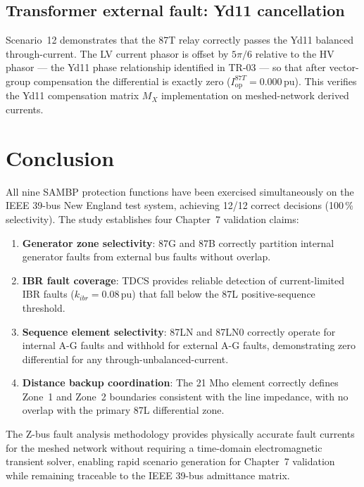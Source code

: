 \documentclass[12pt,a4paper]{article}
\newcommand{\Iop}{I_{\mathrm{op}}}
\begin{document}
\subsection{Transformer external fault: Yd11 cancellation}
\label{sec:yd11}

Scenario~12 demonstrates that the 87T relay correctly passes the Yd11
balanced through-current.  The LV current phasor is offset by $5\pi/6$
relative to the HV phasor — the Yd11 phase relationship identified in
TR-03 — so that after vector-group compensation the differential is
exactly zero ($\Iop^{87T} = 0.000$\,pu).  This verifies the Yd11
compensation matrix $M_X$ implementation on meshed-network derived currents.

\section{Conclusion}
\label{sec:conclusion}

All nine SAMBP protection functions have been exercised simultaneously on the
IEEE 39-bus New England test system, achieving 12/12 correct decisions
(100\,\% selectivity).  The study establishes four Chapter~7 validation claims:

\begin{enumerate}
  \item \textbf{Generator zone selectivity}: 87G and 87B correctly partition
    internal generator faults from external bus faults without overlap.
  \item \textbf{IBR fault coverage}: TDCS provides reliable detection of
    current-limited IBR faults ($k_{ibr} = 0.08$\,pu) that fall below the
    87L positive-sequence threshold.
  \item \textbf{Sequence element selectivity}: 87LN and 87LN0 correctly
    operate for internal A-G faults and withhold for external A-G faults,
    demonstrating zero differential for any through-unbalanced-current.
  \item \textbf{Distance backup coordination}: The 21 Mho element correctly
    defines Zone~1 and Zone~2 boundaries consistent with the line impedance,
    with no overlap with the primary 87L differential zone.
\end{enumerate}

The Z-bus fault analysis methodology provides physically accurate fault currents
for the meshed network without requiring a time-domain electromagnetic
transient solver, enabling rapid scenario generation for Chapter~7
validation while remaining traceable to the IEEE 39-bus admittance matrix.
\end{document}
